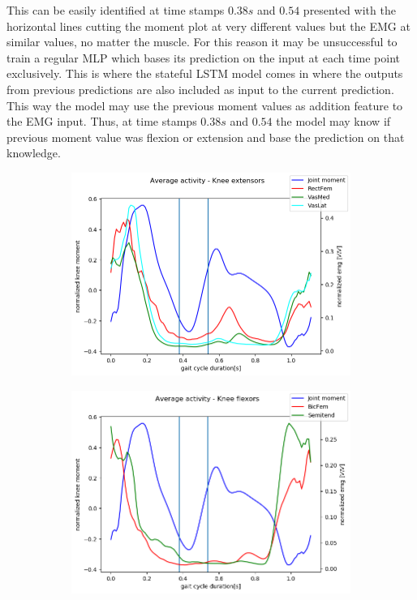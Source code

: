 \documentclass[../main.tex]{subfiles}
\begin{document}
This can be easily identified at time stamps $0.38s$ and $0.54$ presented with the horizontal lines cutting the moment plot at very different values but the \ac{EMG} at similar values, no matter the muscle.
For this reason it may be unsuccessful to train a regular \ac{MLP} which bases its prediction on the input at each time point exclusively. 
This is where the stateful \ac{LSTM} model comes in where the outputs from previous predictions are also included as input to the current prediction. 
This way the model may use the previous moment values as addition feature to the \ac{EMG} input.
Thus, at time stamps $0.38s$ and $0.54$ the model may know if previous moment value was flexion or extension and base the prediction on that knowledge.
\begin{figure}
     \centering
     \begin{subfigure}[b]{0.45\textwidth}
         \centering
         \includegraphics[width=\textwidth]{img/results/norm_emg_knee_ext_hline.png}
     \end{subfigure}
     \hfill
     \begin{subfigure}[b]{0.45\textwidth}
         \centering
         \includegraphics[width=\textwidth]{img/results/norm_emg_knee_flex_hline.png}

\end{subfigure}
\end{figure}
\end{document}

